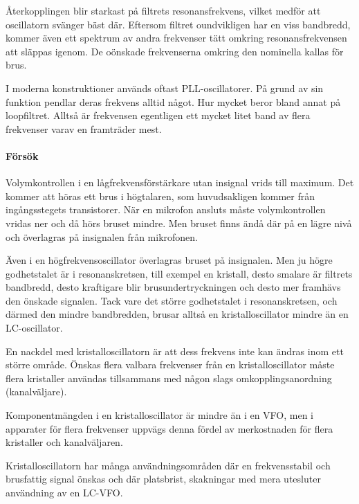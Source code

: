 Återkopplingen blir starkast på filtrets resonansfrekvens, vilket
medför att oscillatorn svänger bäst där.
Eftersom filtret oundvikligen har en viss bandbredd, kommer även ett
spektrum av andra frekvenser tätt omkring resonansfrekvensen att släppas
igenom.
De oönskade frekvenserna omkring den nominella kallas för brus.

I moderna konstruktioner används oftast PLL-oscillatorer.
På grund av sin funktion pendlar deras frekvens alltid något.
Hur mycket beror bland annat på loopfiltret.
Alltså är frekvensen egentligen ett mycket litet band av flera frekvenser varav
en framträder mest.

\newpage
\paragraph{Försök}

Volymkontrollen i en lågfrekvensförstärkare utan insignal vrids till maximum.
Det kommer att höras ett brus i högtalaren, som huvudsakligen kommer från
ingångsstegets transistorer.
När en mikrofon ansluts måste volymkontrollen vridas ner och då hörs bruset
mindre.
Men bruset finns ändå där på en lägre nivå och överlagras på insignalen från
mikrofonen.

Även i en högfrekvensoscillator överlagras bruset på insignalen.
Men ju högre godhetstalet är i resonanskretsen, till exempel en kristall, desto
smalare är filtrets bandbredd, desto kraftigare blir brusundertryckningen och
desto mer framhävs den önskade signalen.
Tack vare det större godhetstalet i resonanskretsen, och därmed den mindre
bandbredden, brusar alltså en kristalloscillator mindre än en LC-oscillator.

En nackdel med kristalloscillatorn är att dess frekvens inte kan ändras inom 
ett större område.
Önskas flera valbara frekvenser från en kristalloscillator måste flera
kristaller användas tillsammans med någon slags omkopplingsanordning
(kanalväljare).

Komponentmängden i en kristalloscillator är mindre än i en VFO, men i
apparater för flera frekvenser uppvägs denna fördel av merkostnaden
för flera kristaller och kanalväljaren.

Kristalloscillatorn har många användningsområden där en
frekvensstabil och brusfattig signal önskas och där platsbrist,
skakningar med mera utesluter användning av en LC-VFO.
